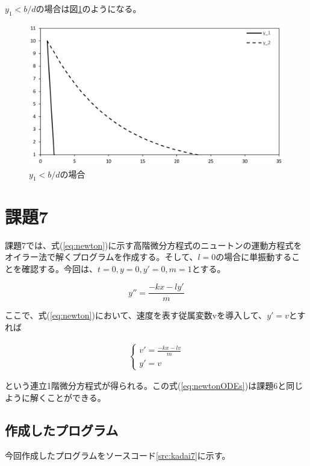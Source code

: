 \documentclass[11pt,titlepage]{jsarticle}
\begin{document}
$y_1 < b/d$の場合は図\ref{fig:y1<b/d}のようになる。
\begin{figure}[H]
\centering
\includegraphics[width=12cm]{img/y1small_bd.png}
\caption{$y_1 < b/d$の場合}
\label{fig:y1<b/d}
\end{figure}

\section{課題7}
課題7では、式(\ref{eq:newton})に示す高階微分方程式のニュートンの運動方程式をオイラー法で解くプログラムを作成する。そして、$l=0$の場合に単振動することを確認する。今回は、$t=0, y=0, y'=0, m=1$とする。

\begin{equation}
\label{eq:newton}
	y''=\frac{-kx-ly'}{m}
\end{equation}

ここで、式(\ref{eq:newton})において、速度を表す従属変数vを導入して、$y'=v$とすれば

\begin{eqnarray}
\label{eq:newtonODEs}
	\left\{
		\begin{array}{l}
			v'=\frac{-kx-lv}{m}\\
			y'=v
		\end{array}
	\right.
\end{eqnarray}

という連立1階微分方程式が得られる。この式(\ref{eq:newtonODEs})は課題6と同じように解くことができる。

\subsection{作成したプログラム}
今回作成したプログラムをソースコード\ref{src:kadai7}に示す。


\end{document}
